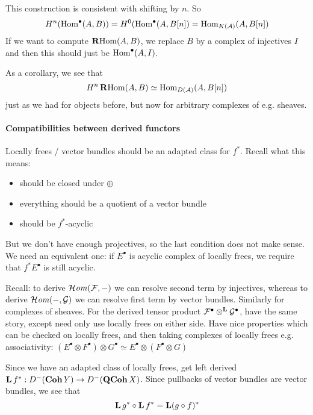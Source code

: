 This construction is consistent with shifting by $n$. So $$H^n(\operatorname{Hom}^\bullet(A,B))=H^0(\operatorname{Hom}^\bullet(A,B[n])=\operatorname{Hom}_{K(\mathcal{A})}(A,B[n])$$
If we want to compute $\operatorname{\mathbf{R}Hom}(A,B)$, we replace $B$ by a complex of injectives $I$ and then this should just be $\operatorname{Hom}^\bullet(A,I)$.

As a corollary, we see that $$H^n\operatorname{\mathbf{R}Hom}(A,B)\simeq \operatorname{Hom}_{D(\mathcal{A})}(A,B[n])$$just as we had for objects before, but now for arbitrary complexes of e.g. sheaves.

\paragraph{Compatibilities between derived functors}

Locally frees / vector bundles should be an adapted class for $f^*$. Recall what this means:
\begin{itemize}
    \item should be closed under $\oplus$
    \item everything should be a quotient of a vector bundle
    \item should be $f^*$-acyclic
\end{itemize}

But we don't have enough projectives, so the last condition does not make sense. We need an equivalent one: if $E^\bullet$ is acyclic complex of locally frees, we require that $f^*E^\bullet$ is still acyclic.

Recall: to derive $\operatorname{\mathcal{H}\mathit{om}}(\mathcal{F}, -)$ we can resolve second term by injectives, whereas to derive $\operatorname{\mathcal{H}\mathit{om}}(-,\mathcal{G})$ we can resolve first term by vector bundles. Similarly for complexes of sheaves. For the derived tensor product $\mathcal{F}^\bullet\otimes^{\operatorname{\mathbf{L}}}\mathcal{G}^\bullet$, have the same story, except need only use locally frees on either side. Have nice properties which can be checked on locally frees, and then taking complexes of locally frees e.g. associativity: $(E^\bullet \otimes F^\bullet ) \otimes G^\bullet \simeq E^\bullet \otimes (F^\bullet \otimes G)$

Since we have an adapted class of locally frees, get left derived $\operatorname{\mathbf{L}} f^*:D^-(\operatorname{\mathbf{Coh}} Y)\rightarrow D^-(\operatorname{\mathbf{QCoh}} X)$. Since pullbacks of vector bundles are vector bundles, we see that $$\operatorname{\mathbf{L}} g^*\circ \operatorname{\mathbf{L}} f^*=\operatorname{\mathbf{L}} (g\circ f)^*$$


